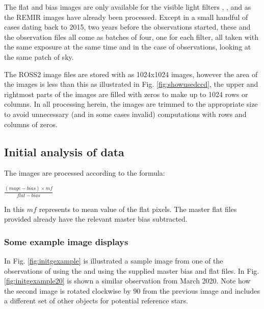 The flat and bias images are only available for the visible light filters
, ,  and  as the REMIR images
have already been processed. Except in a small handful of cases dating back to 2015, two years
before the {\rdwarf} observations started, these and the observation files all
come as batches of four, one for each filter, all taken with the same exposure at the same time
and in the case of observations, looking at the same patch of sky.

The ROSS2 image files are stored with as 1024x1024 images, however the area of
the images is less than this as illustrated in Fig. \ref{fig:showusedccd}, the
upper and rightmost parts of the images are filled with zeros to make up to 1024
rows or columns. In all processing herein, the images are trimmed to the
appropriate size to avoid unnecessary (and in some cases invalid) computations
with rows and columns of zeros.

\subsection{Initial analysis of data}
\protect\label{section:initialanalysis}

The images are processed according to the formula:

\begin{center}
$ \frac{(mage - bias) \times mf}{flat - bias}$
\end{center}

In this $mf$ represents to mean value of the flat pixels. The master flat files
provided already have the relevant master bias subtracted.

\subsubsection{Some example image displays}
\protect\label{section:eximages}

In Fig. \ref{fig:initgexample} is illustrated a sample image from one of the
observations of {\bstar} using the {\gfilter} and using the supplied master
bias and flat files. In Fig.
\ref{fig:initgexample20} is shown a similar observation from March 2020. Note
how the second image is rotated clockwise by 90\degree{} from the previous image
and includes a different set of other objects for potential reference stars.

